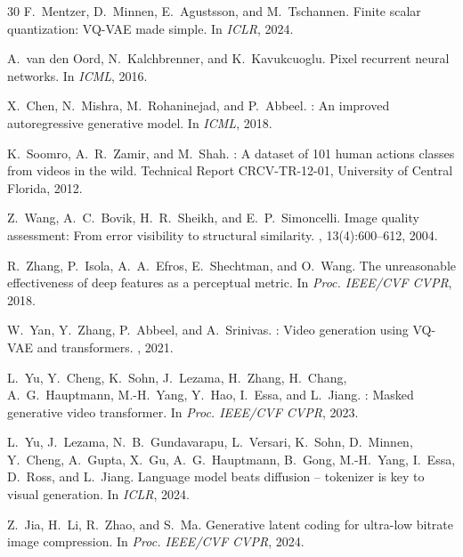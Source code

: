 \documentclass[sigconf, screen, review, anonymous]{acmart}
\begin{document}
\begin{thebibliography}{30}
F.~Mentzer, D.~Minnen, E.~Agustsson, and M.~Tschannen.
\newblock Finite scalar quantization: {VQ-VAE} made simple.
\newblock In {\em ICLR}, 2024.

A.~van den Oord, N.~Kalchbrenner, and K.~Kavukcuoglu.
\newblock Pixel recurrent neural networks.
\newblock In {\em ICML}, 2016.

X.~Chen, N.~Mishra, M.~Rohaninejad, and P.~Abbeel.
: An improved autoregressive generative model.
\newblock In {\em ICML}, 2018.

K.~Soomro, A.~R.~Zamir, and M.~Shah.
: A dataset of 101 human actions classes from videos in the
  wild.
\newblock Technical Report CRCV-TR-12-01, University of Central Florida, 2012.

Z.~Wang, A.~C.~Bovik, H.~R.~Sheikh, and E.~P.~Simoncelli.
\newblock Image quality assessment: From error visibility to structural
  similarity.
, 13(4):600--612, 2004.

R.~Zhang, P.~Isola, A.~A.~Efros, E.~Shechtman, and O.~Wang.
\newblock The unreasonable effectiveness of deep features as a perceptual
  metric.
\newblock In {\em Proc. IEEE/CVF CVPR}, 2018.


W.~Yan, Y.~Zhang, P.~Abbeel, and A.~Srinivas.
: Video generation using {VQ-VAE} and transformers.
, 2021.

L.~Yu, Y.~Cheng, K.~Sohn, J.~Lezama, H.~Zhang, H.~Chang,
  A.~G.~Hauptmann, M.-H.~Yang, Y.~Hao, I.~Essa, and L.~Jiang.
: Masked generative video transformer.
\newblock In {\em Proc. IEEE/CVF CVPR}, 2023.

L.~Yu, J.~Lezama, N.~B.~Gundavarapu, L.~Versari, K.~Sohn, D.~Minnen,
  Y.~Cheng, A.~Gupta, X.~Gu, A.~G.~Hauptmann, B.~Gong, M.-H.~Yang,
  I.~Essa, D.~Ross, and L.~Jiang.
\newblock Language model beats diffusion -- tokenizer is key to visual
  generation.
\newblock In {\em ICLR}, 2024.

Z.~Jia, H.~Li, R.~Zhao, and S.~Ma.
\newblock Generative latent coding for ultra-low bitrate image compression.
\newblock In {\em Proc. IEEE/CVF CVPR}, 2024.


\end{thebibliography}
\end{document}
